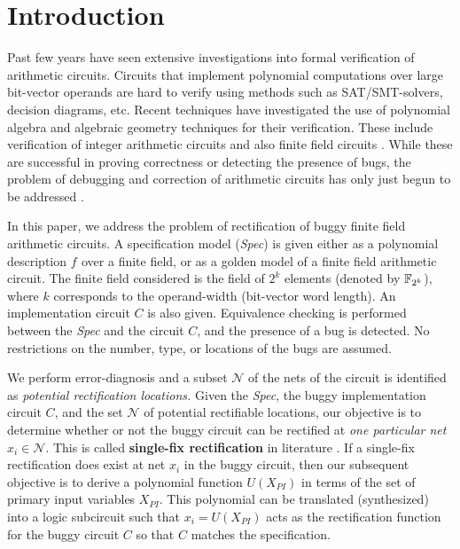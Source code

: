 \section{Introduction}

Past few years have seen extensive investigations into formal
verification of arithmetic circuits. Circuits that implement
polynomial computations over large bit-vector operands are hard to
verify using methods such as SAT/SMT-solvers, decision diagrams,
etc. Recent techniques have investigated the use of polynomial algebra
and algebraic geometry techniques for their verification. These
include verification of integer arithmetic circuits
\cite{Armin2017ColumnWiseVO} \cite{maciej:2015} \cite{rolf:2016} and
also finite field circuits \cite{lv:tcad2013}
\cite{blueveri:fmsd}. While these are successful in proving
correctness or detecting the presence of bugs, the problem of
debugging and correction of arithmetic circuits has only just begun to
be addressed \cite{farimah:2017:1,farimah:2016:1}. 

In this paper, we address the problem of rectification of buggy finite
field arithmetic circuits. A specification model ({\it Spec}) is given
either as a  polynomial description $f_{}$ over a finite field, or as a
golden model of a finite field arithmetic circuit. The finite field
considered is the field of $2^k$ elements (denoted by ${\mathbb{F}}_{2^k}$), where
$k$ corresponds to the operand-width (bit-vector word length). An
  implementation circuit $C$ is also given. Equivalence checking is performed between the {\it Spec} and the
  circuit $C$, and the presence of a bug is detected. No restrictions
  on the number, type, or locations of the bugs are assumed.

We perform error-diagnosis and a subset   $\mathcal{N}$ of the nets of
the circuit is identified as {\it potential rectification locations.}
Given the {\it Spec}, the buggy implementation circuit $C$, and the set
$\mathcal{N}$ of potential rectifiable locations, our objective is to determine
whether or not the buggy circuit can be rectified at {\it one
  particular net $x_i\in \mathcal{N}$}. This is called {\bf
  single-fix rectification} in literature \cite{Huang:DAC2011}. If a
single-fix rectification does exist at net $x_i$ in the buggy circuit,
then our subsequent objective is to derive a polynomial function
$U(X_{PI})$ in terms of the set of primary input variables
$X_{PI}$. This polynomial can be translated (synthesized) into a logic
subcircuit such that $x_i = U(X_{PI})$ acts as the rectification
function for the buggy circuit $C$ so that $C$ matches the
specification. 

